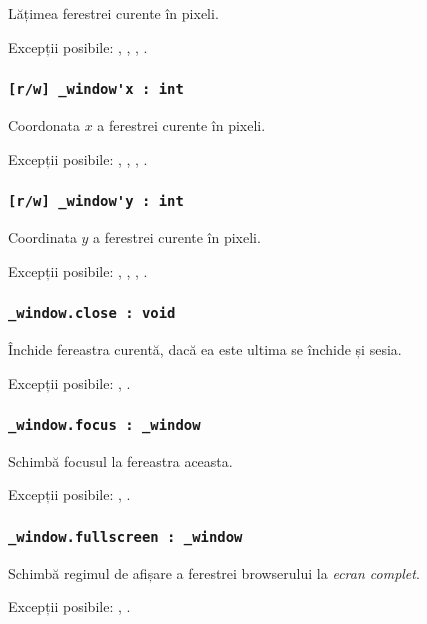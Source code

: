Lățimea ferestrei curente în pixeli.

Excepții posibile: , , , .

\subsubsection{\lstinline|[r/w] _window'x : int|}

Coordonata $x$ a ferestrei curente în pixeli.

Excepții posibile: , , , .

\subsubsection{\lstinline|[r/w] _window'y : int|}

Coordinata $y$ a ferestrei curente în pixeli.

Excepții posibile: , , , .

\subsubsection{\lstinline|_window.close : void|}

Închide fereastra curentă, dacă ea este ultima se închide și sesia.

Excepții posibile: , .

\subsubsection{\lstinline|_window.focus : _window|}

Schimbă focusul la fereastra aceasta.

Excepții posibile: , .

\subsubsection{\lstinline|_window.fullscreen : _window|}

Schimbă regimul de afișare a ferestrei browserului la \textit{ecran complet}.

Excepții posibile: , .

